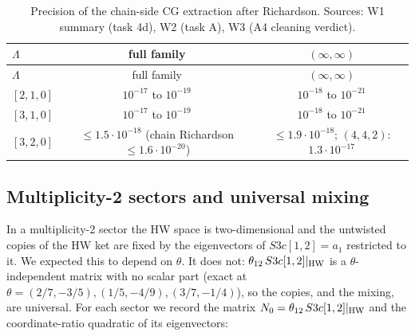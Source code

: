 \documentclass[11pt]{article}
\begin{document}
{\small
\begin{longtable}{lcc}
\caption{Precision of the chain-side CG extraction after Richardson.
Sources: W1 summary (task 4d), W2 (task A), W3 (A4 cleaning verdict).}\label{tab:cgprec}\\
\toprule
$\Lambda$ & full family & $(\infty,\infty)$ \\
\midrule
\endfirsthead
\toprule
$\Lambda$ & full family & $(\infty,\infty)$ \\
\midrule
\endhead
\bottomrule
\endlastfoot
$[2,1,0]$ & $10^{-17}$ to $10^{-19}$ & $10^{-18}$ to $10^{-21}$ \\
$[3,1,0]$ & $10^{-17}$ to $10^{-19}$ & $10^{-18}$ to $10^{-21}$ \\
$[3,2,0]$ & $\le1.5\cdot10^{-18}$ (chain Richardson $\le1.6\cdot10^{-20}$) & $\le1.9\cdot10^{-18}$; $(4,4,2)$: $1.3\cdot10^{-17}$ \\
\end{longtable}}


\subsection{Multiplicity-2 sectors and universal mixing}\label{sec:mixing}

In a multiplicity-2 sector the HW space is two-dimensional and the untwisted copies of the HW ket are fixed by the eigenvectors of $S3c[1,2]=a_1$ restricted to it.
We expected this to depend on $\theta$. It does not: $\theta_{12}\,S3c[1,2]|_{\rm HW}$ is a $\theta$-independent matrix with no scalar part (exact at $\theta=(2/7,-3/5),(1/5,-4/9),(3/7,-1/4)$), so the copies, and the mixing, are universal.
For each sector we record the matrix $N_0=\theta_{12}\,S3c[1,2]|_{\rm HW}$ and the coordinate-ratio quadratic of its eigenvectors:
\end{document}
